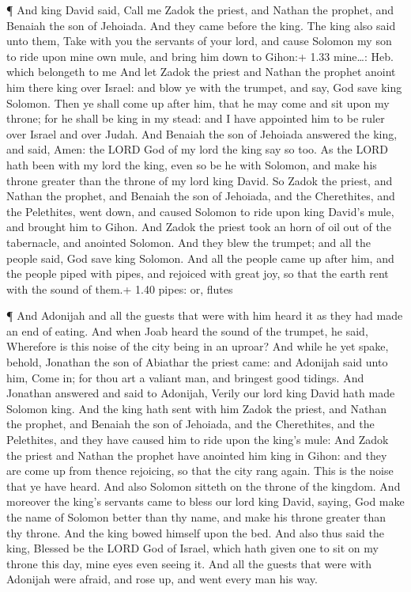  ¶ And king David said, Call me Zadok the priest, and
Nathan the prophet, and Benaiah the son of Jehoiada. And they came
before the king.  The king also said unto them, Take with
you the servants of your lord, and cause Solomon my son to ride upon
mine own mule, and bring him down to Gihon:+ 1.33 mine\ldots: Heb. which
belongeth to me  And let Zadok the priest and Nathan the
prophet anoint him there king over Israel: and blow ye with the trumpet,
and say, God save king Solomon.  Then ye shall come up
after him, that he may come and sit upon my throne; for he shall be king
in my stead: and I have appointed him to be ruler over Israel and over
Judah.  And Benaiah the son of Jehoiada answered the king,
and said, Amen: the LORD God of my lord the king say so too.
 As the LORD hath been with my lord the king, even so be he
with Solomon, and make his throne greater than the throne of my lord
king David.  So Zadok the priest, and Nathan the prophet,
and Benaiah the son of Jehoiada, and the Cherethites, and the
Pelethites, went down, and caused Solomon to ride upon king David's
mule, and brought him to Gihon.  And Zadok the priest took
an horn of oil out of the tabernacle, and anointed Solomon. And they
blew the trumpet; and all the people said, God save king Solomon.
 And all the people came up after him, and the people piped
with pipes, and rejoiced with great joy, so that the earth rent with the
sound of them.+ 1.40 pipes: or, flutes

 ¶ And Adonijah and all the guests that were with him heard
it as they had made an end of eating. And when Joab heard the sound of
the trumpet, he said, Wherefore is this noise of the city being in an
uproar?  And while he yet spake, behold, Jonathan the son
of Abiathar the priest came: and Adonijah said unto him, Come in; for
thou art a valiant man, and bringest good tidings.  And
Jonathan answered and said to Adonijah, Verily our lord king David hath
made Solomon king.  And the king hath sent with him Zadok
the priest, and Nathan the prophet, and Benaiah the son of Jehoiada, and
the Cherethites, and the Pelethites, and they have caused him to ride
upon the king's mule:  And Zadok the priest and Nathan the
prophet have anointed him king in Gihon: and they are come up from
thence rejoicing, so that the city rang again. This is the noise that ye
have heard.  And also Solomon sitteth on the throne of the
kingdom.  And moreover the king's servants came to bless
our lord king David, saying, God make the name of Solomon better than
thy name, and make his throne greater than thy throne. And the king
bowed himself upon the bed.  And also thus said the king,
Blessed be the LORD God of Israel, which hath given one to sit on my
throne this day, mine eyes even seeing it.  And all the
guests that were with Adonijah were afraid, and rose up, and went every
man his way.


